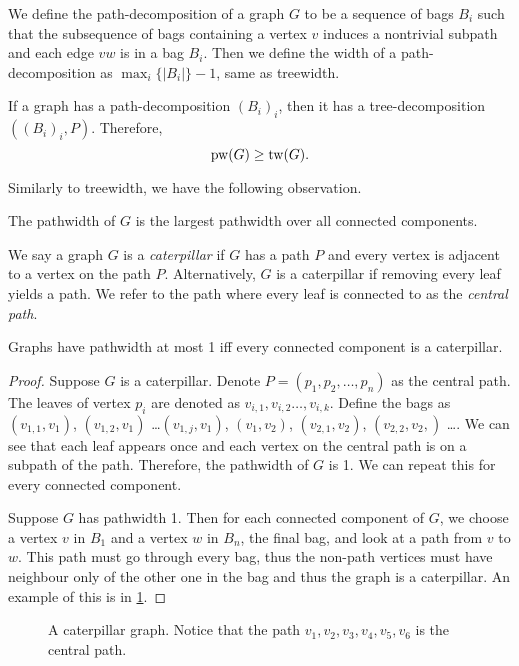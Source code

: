 We define the path-decomposition of a graph \(G\) to be a sequence of bags \(B_i\) such that the subsequence of bags containing a vertex \(v\) induces a nontrivial subpath and each edge \(vw\) is in a bag \(B_i\). Then we define the width of a path-decomposition as \(\max_i \lbrace |B_i| \rbrace -1\), same as treewidth.

If a graph has a path-decomposition \({(B_i)}_i\), then it has a tree-decomposition \(\left({(B_i)}_i, P\right)\). Therefore,
\begin{equation}
	\operatorname{pw}(G) \geq \operatorname{tw}(G).
\end{equation}

Similarly to treewidth, we have the following observation.
\begin{lemma}
	The pathwidth of \(G\) is the largest pathwidth over all connected components.
\end{lemma}
We say a graph \(G\) is a \textit{caterpillar} if \(G\) has a path \(P\) and every vertex is adjacent to a vertex on the path \(P\). Alternatively, \(G\) is a caterpillar if removing every leaf yields a path. We refer to the path where every leaf is connected to as the \textit{central path}.
\begin{theorem}[Caterpillars]
	Graphs have pathwidth at most 1 iff every connected component is a caterpillar.
\end{theorem}
\begin{proof}
	Suppose \(G\) is a caterpillar.
	Denote \(P =\left( p_1, p_2, \dots, p_n\right)\) as the central path. The leaves of vertex \(p_i\) are denoted as \(v_{i, 1}, v_{i, 2} \dots, v_{i, k}\). Define the bags as \((v_{1, 1}, v_1)\), \((v_{1, 2}, v_1)\) \dots \((v_{1, j}, v_1)\),  \((v_1, v_2)\), \((v_{2, 1}, v_2)\), \((v_{2,2}, v_2,)\) \dots. We can see that each leaf appears once and each vertex on the central path is on a subpath of the path. Therefore, the pathwidth of \(G\) is 1. We can repeat this for every connected component.
	\par
	Suppose \(G\) has pathwidth 1. Then for each connected component of \(G\), we choose a vertex \(v\) in \(B_1\) and a vertex \(w\) in \(B_n\), the final bag, and look at a path from \(v\) to \(w\). This path must go through every bag, thus the non-path vertices must have neighbour only of the other one in the bag and thus the graph is a caterpillar. An example of this is in \cref{fig:caterpillar}.
\end{proof}
\begin{figure}[ht]
	\centering
	
	\caption{A caterpillar graph. Notice that the path \(v_1, v_2, v_3, v_4, v_5, v_6\) is the central path.}
	\label{fig:caterpillar}
\end{figure}

